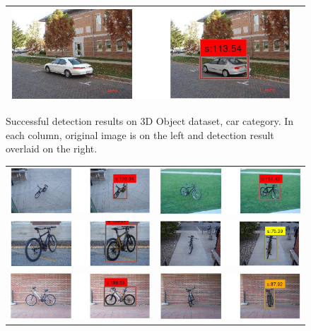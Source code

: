 \documentclass[10pt,twocolumn,letterpaper]{article}
\begin{document}
\begin{figure}[h]
\begin{tabular}{|c|c|}
  \includegraphics[width=0.40\linewidth]{supp/car31.png} \\
  \hline
  \end{tabular}
\caption{Successful detection results on 3D Object dataset, car
category. In each column, original image is on the left and detection result overlaid on
the right.}%
  \label{fig:3dobject_car_good}
\end{figure}

\begin{figure}[h]
\setlength\tabcolsep{1pt}
\centering
\begin{tabular}{|c|c|}
  \hline
  \includegraphics[width=0.40\linewidth]{supp/bicycle17.png} &
  \includegraphics[width=0.40\linewidth]{supp/bicycle18.png} \\
  \includegraphics[width=0.40\linewidth]{supp/bicycle13.png} &
  \includegraphics[width=0.40\linewidth]{supp/bicycle9.png} \\
  \includegraphics[width=0.40\linewidth]{supp/bicycle16.png} &
  \includegraphics[width=0.40\linewidth]{supp/bicycle12.png} \\

\end{tabular}
\end{figure}
\end{document}
